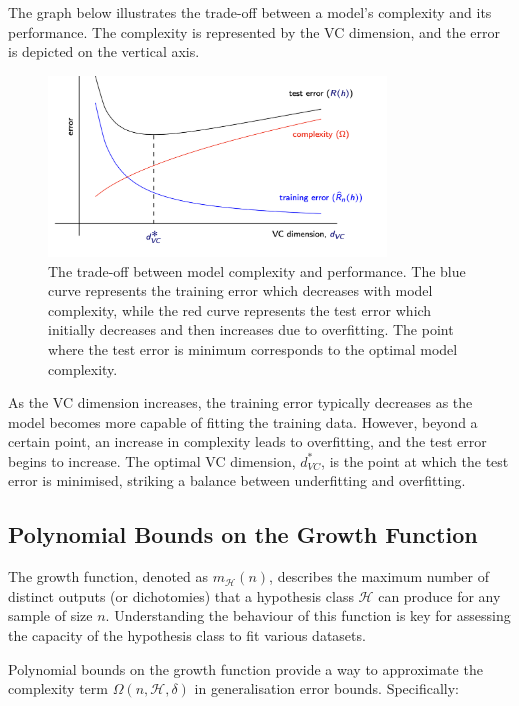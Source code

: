 The graph below illustrates the trade-off between a model's complexity and its performance. The complexity is represented by the VC dimension, and the error is depicted on the vertical axis. 

\begin{figure}[H]
\centering
\includegraphics[width=0.8\textwidth]{img/perf-vs-cmplxty.png} %
\caption{The trade-off between model complexity and performance. The blue curve represents the training error which decreases with model complexity, while the red curve represents the test error which initially decreases and then increases due to overfitting. The point where the test error is minimum corresponds to the optimal model complexity.}
\label{fig:performance_vs_complexity}
\end{figure}

As the VC dimension increases, the training error typically decreases as the model becomes more capable of fitting the training data. However, beyond a certain point, an increase in complexity leads to overfitting, and the test error begins to increase. The optimal VC dimension, \(d_{VC}^*\), is the point at which the test error is minimised, striking a balance between underfitting and overfitting.


\subsection{Polynomial Bounds on the Growth Function}

The growth function, denoted as \(m_{\mathcal{H}}(n)\), describes the maximum number of distinct outputs (or dichotomies) that a hypothesis class \(\mathcal{H}\) can produce for any sample of size \(n\). Understanding the behaviour of this function is key for assessing the capacity of the hypothesis class to fit various datasets.

Polynomial bounds on the growth function provide a way to approximate the complexity term \(\Omega(n, \mathcal{H}, \delta)\) in generalisation error bounds. Specifically:

